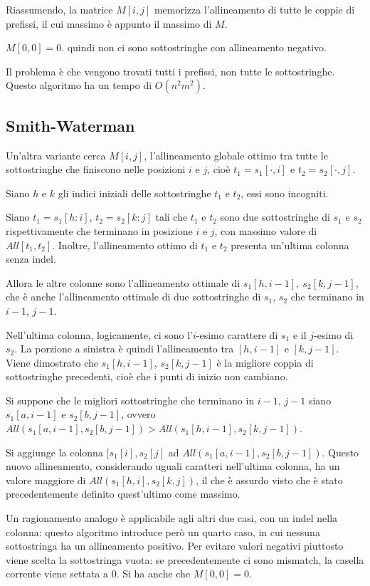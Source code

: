 Riassumendo, la matrice $M[i, j]$ memorizza l'allineamento di tutte le coppie di prefissi, il cui massimo è appunto il massimo di $M$. 

$M[0, 0] = 0$. quindi non ci sono sottostringhe con allineamento negativo.

Il problema è che vengono trovati tutti i prefissi, non tutte le sottostringhe. Questo algoritmo ha un tempo di $O(n^2m^2)$.

\subsection{Smith-Waterman}
Un'altra variante cerca $M[i, j]$, l'allineamento globale ottimo tra tutte le sottostringhe che finiscono nelle posizioni $i$ e $j$,  cioè $t_1 = s_1[\cdot, i]$ e $t_2 = s_2[\cdot, j]$.

Siano $h$ e $k$ gli indici iniziali delle sottostringhe $t_1$ e $t_2$, essi sono incogniti. 

Siano $t_1 = s_1[h : i]$, $t_2 = s_2[k : j]$ tali che $t_1$ e $t_2$ sono due sottostringhe di $s_1$ e $s_2$ rispettivamente che terminano in posizione $i$ e $j$, con massimo valore di $All[t_1, t_2]$. Inoltre, l'allineamento ottimo di $t_1$ e $t_2$ presenta un'ultima colonna senza indel.

Allora le altre colonne sono l'allineamento ottimale di $s_1[h, i-1],\ s_2[k, j-1]$, che è anche l'allineamento ottimale di due sottostringhe di $s_1$, $s_2$ che terminano in $i-1$, $j-1$.

Nell'ultima colonna, logicamente, ci sono l'$i$-esimo carattere di $s_1$ e il $j$-esimo di $s_2$. La porzione a sinistra è quindi l'allineamento tra $[h, i-1]$ e $[k, j-1]$. Viene dimostrato che $s_1[h, i-1]$, $s_2[k, j-1]$ è la migliore coppia di sottostringhe precedenti, cioè che i punti di inizio non cambiano.

Si suppone che le migliori sottostringhe che terminano in $i-1$, $j-1$ siano $s_1[a, i-1]$ e $s_2[b, j-1]$, ovvero $All(s_1[a, i-1], s_2[b, j-1]) > All(s_1[h, i-1], s_2[k, j-1])$. 

Si aggiunge la colonna $[s_1[i], s_2[j]$ ad $All(s_1[a, i-1], s_2[b, j-1])$. Questo nuovo allineamento, considerando uguali caratteri nell'ultima colonna, ha un valore maggiore di $All(s_1[h, i], s_2[k, j])$, il che è assurdo visto che è stato precedentemente definito quest'ultimo come massimo.

Un ragionamento analogo è applicabile agli altri due casi, con un indel nella colonna: questo algoritmo introduce però un quarto caso, in cui nessuna sottostringa ha un allineamento positivo. Per evitare valori negativi piuttosto viene scelta la sottostringa vuota: se precedentemente ci sono mismatch, la casella corrente viene settata a 0. Si ha anche che $M[0, 0] = 0$.

